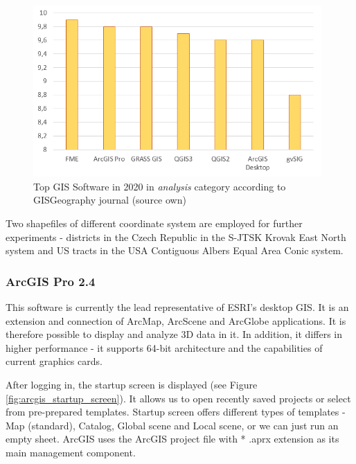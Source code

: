 \documentclass[a4paper,10pt,twoside]{article}
\begin{document}
\vspace{0.3cm}
\begin{figure}[hbt!] 
\begin{center}
\includegraphics[width=11cm]{../pictures/hodnoceni_analysis.png} 
\caption[Top GIS Software in 2020 in \textit{analysis} category according to GISGeography journal (source own)]{Top GIS Software in 2020 in \textit{analysis} category according to GISGeography journal  (source own)}
\label{fig:hodnoceni_analysis}
\end{center}
\end{figure}

Two shapefiles of different coordinate system are employed for further experiments - districts in the Czech Republic in the S-JTSK Krovak East North system and US tracts in the USA Contiguous Albers Equal Area Conic system.

\newpage
\vspace*{-1cm}
\subsubsection{ArcGIS Pro 2.4}
\noindent
\large
This software is currently the lead representative of ESRI's desktop GIS. It is an extension and connection of ArcMap, ArcScene and ArcGlobe applications. It is therefore possible to display and analyze 3D data in it. In addition, it differs in higher performance - it supports 64-bit architecture and the capabilities of current graphics cards. 

After logging in, the startup screen is displayed (see Figure \ref{fig:arcgis_startup_screen}). It allows us to open recently saved projects or select from pre-prepared templates. Startup screen offers different types of templates - Map (standard), Catalog, Global scene and Local scene, or we can just run an empty sheet. ArcGIS uses the ArcGIS project file with * .aprx extension as its  main management component.
\end{document}
